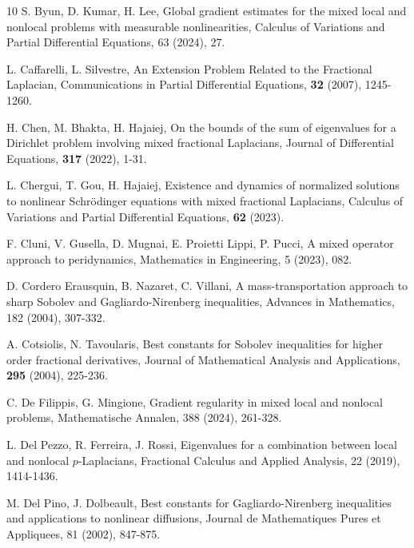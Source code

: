 \documentclass[12pt,a4paper,reqno]{amsart}
\numberwithin{equation}{section}
\begin{document}
\begin{thebibliography}{10}
S. Byun, D. Kumar, H. Lee,
Global gradient estimates for the mixed local and nonlocal problems with measurable nonlinearities,
Calculus of Variations and Partial Differential Equations,
63 (2024), 27.


L. Caffarelli, L. Silvestre,
An Extension Problem Related to the Fractional Laplacian,
Communications in Partial Differential Equations,
\textbf{32} (2007), 1245-1260.


H. Chen, M. Bhakta, H. Hajaiej,
On the bounds of the sum of eigenvalues for a Dirichlet
problem involving mixed fractional Laplacians,
Journal of Differential Equations,
\textbf{317} (2022), 1-31.



L. Chergui, T. Gou, H. Hajaiej,
Existence and dynamics of normalized solutions to nonlinear Schr\"odinger equations with mixed fractional Laplacians,
Calculus of Variations and Partial Differential Equations,
\textbf{62} (2023).

F. Cluni, V. Gusella, D. Mugnai, E. Proietti Lippi, P. Pucci,
A mixed operator approach to peridynamics,
Mathematics in Engineering,
5 (2023), 082.


D. Cordero Erausquin, B. Nazaret,  C. Villani,
A mass-transportation approach to sharp
Sobolev and Gagliardo-Nirenberg inequalities,
Advances in Mathematics,
182 (2004), 307-332.



A. Cotsiolis, N. Tavoularis,
Best constants for Sobolev inequalities for higher order fractional derivatives,
Journal of Mathematical Analysis and Applications,
\textbf{295} (2004), 225-236.





C. De Filippis, G. Mingione,
Gradient regularity in mixed local and nonlocal problems,
Mathematische Annalen, 388 (2024), 261-328.


L. Del Pezzo, R. Ferreira, J. Rossi,
Eigenvalues for a combination between local and nonlocal $p$-Laplacians,
Fractional Calculus and Applied Analysis,
22 (2019), 1414-1436.


M. Del Pino, J. Dolbeault,
Best constants for Gagliardo-Nirenberg inequalities and applications to nonlinear diffusions,
Journal de Mathematiques Pures et Appliquees,
81 (2002), 847-875.




\end{thebibliography}
\end{document}
